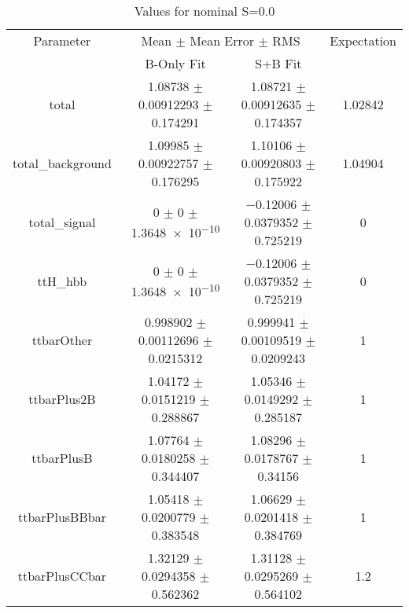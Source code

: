 \begin{table}
\centering
\caption{Values for nominal S=0.0}
\begin{tabular}{cccc}
\toprule
Parameter & \multicolumn{2}{c}{Mean $\pm$ Mean Error $\pm$ RMS} & Expectation\\
 & B-Only Fit & S+B Fit & \\
\midrule
total & \num{1.08738} $\pm$ \num{0.00912293} $\pm$ \num{0.174291} & \num{1.08721} $\pm$ \num{0.00912635} $\pm$ \num{0.174357} & \num{1.02842}\\
total\_background & \num{1.09985} $\pm$ \num{0.00922757} $\pm$ \num{0.176295} & \num{1.10106} $\pm$ \num{0.00920803} $\pm$ \num{0.175922} & \num{1.04904}\\
total\_signal & \num{0} $\pm$ \num{0} $\pm$ \num{1.3648e-10} & \num{-0.12006} $\pm$ \num{0.0379352} $\pm$ \num{0.725219} & \num{0}\\
ttH\_hbb & \num{0} $\pm$ \num{0} $\pm$ \num{1.3648e-10} & \num{-0.12006} $\pm$ \num{0.0379352} $\pm$ \num{0.725219} & \num{0}\\
ttbarOther & \num{0.998902} $\pm$ \num{0.00112696} $\pm$ \num{0.0215312} & \num{0.999941} $\pm$ \num{0.00109519} $\pm$ \num{0.0209243} & \num{1}\\
ttbarPlus2B & \num{1.04172} $\pm$ \num{0.0151219} $\pm$ \num{0.288867} & \num{1.05346} $\pm$ \num{0.0149292} $\pm$ \num{0.285187} & \num{1}\\
ttbarPlusB & \num{1.07764} $\pm$ \num{0.0180258} $\pm$ \num{0.344407} & \num{1.08296} $\pm$ \num{0.0178767} $\pm$ \num{0.34156} & \num{1}\\
ttbarPlusBBbar & \num{1.05418} $\pm$ \num{0.0200779} $\pm$ \num{0.383548} & \num{1.06629} $\pm$ \num{0.0201418} $\pm$ \num{0.384769} & \num{1}\\
ttbarPlusCCbar & \num{1.32129} $\pm$ \num{0.0294358} $\pm$ \num{0.562362} & \num{1.31128} $\pm$ \num{0.0295269} $\pm$ \num{0.564102} & \num{1.2}\\
\bottomrule
\end{tabular}
\end{table}